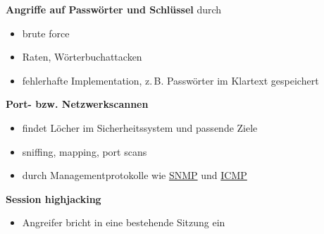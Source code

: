 \textbf{Angriffe auf Passwörter und Schlüssel} durch
\begin{itemize}
  \item brute force
  \item Raten, Wörterbuchattacken
  \item fehlerhafte Implementation, z.\,B. Passwörter im Klartext gespeichert
\end{itemize}
\textbf{Port- bzw. Netzwerkscannen}
\begin{itemize}
  \item findet Löcher im Sicherheitssystem und passende Ziele
  \item sniffing, mapping, port scans
  \item durch Managementprotokolle wie
    \href{https://de.wikipedia.org/wiki/Simple_Network_Management_Protocol}{SNMP} und
    \href{https://de.wikipedia.org/wiki/Internet_Control_Message_Protocol}{ICMP}
\end{itemize}
\textbf{Session highjacking}
\begin{itemize}
  \item Angreifer bricht in eine bestehende Sitzung ein
\end{itemize}
